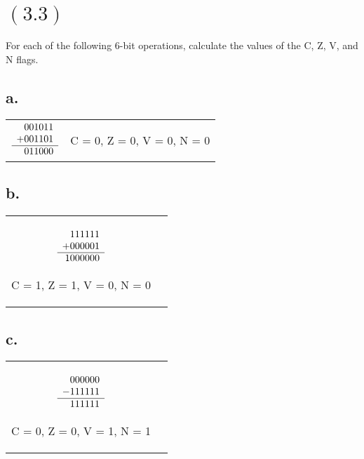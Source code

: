 \documentclass[letterpaper,12pt,titlepage]{article}
\begin{document}
\section*{$(3.3)$} For each of the following 6-bit operations, calculate the values of the C, Z, V, and N flags.

\subsection*{a.}
\begin{mdframed}[style=MyFrame]
\begin{tabular}{c c}

$\begin{array}[t]{r}
   001011 \\
  +001101 \\\hline
   011000 \\
\end{array}$
&
C = 0,
Z = 0,
V = 0,
N = 0
\end{tabular}
\end{mdframed}

\subsection*{b.}

\begin{mdframed}[style=MyFrame]
\begin{tabular}{c c}
$\begin{array}[t]{r}
   111111 \\
  +000001 \\\hline
  1000000 \\
\end{array}$

C = 1,
Z = 1,
V = 0,
N = 0
\end{tabular}
\end{mdframed}

\subsection*{c.}
\begin{mdframed}[style=MyFrame]
\begin{tabular}{c c}
$\begin{array}[t]{r}
   000000 \\
  -111111 \\\hline
   111111 \\
\end{array}$


C = 0,
Z = 0,
V = 1,
N = 1
\end{tabular}
\end{mdframed}
\end{document}
